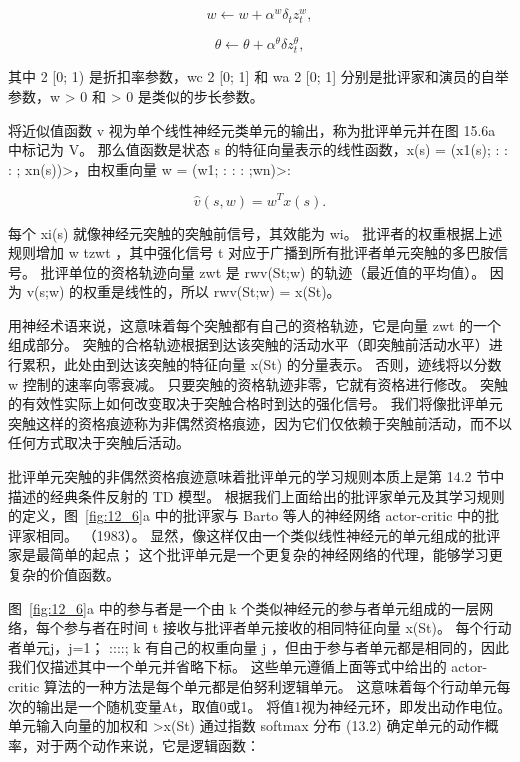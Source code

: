 {\begin{equation}
	w \longleftarrow w + \alpha^w \delta_t z_t^w,
\end{equation}

\begin{equation}
	\theta \longleftarrow \theta + \alpha^{\theta} \delta z_t^{\theta},
\end{equation}

其中 2 [0; 1) 是折扣率参数，wc 2 [0; 1] 和 wa 2 [0; 1] 分别是批评家和演员的自举参数，w > 0 和 > 0 是类似的步长参数。


将近似值函数 v 视为单个线性神经元类单元的输出，称为批评单元并在图 15.6a 中标记为 V。 那么值函数是状态 s 的特征向量表示的线性函数，x(s) = (x1(s); : : : ; xn(s))>，由权重向量 w = (w1; : : : ;wn)>:

\begin{equation}
	\hat{v}(s, w) = w^T x(s).
\end{equation}


每个 xi(s) 就像神经元突触的突触前信号，其效能为 wi。 
批评者的权重根据上述规则增加 w tzwt ，其中强化信号 t 对应于广播到所有批评者单元突触的多巴胺信号。
批评单位的资格轨迹向量 zwt 是 rwv(St;w) 的轨迹（最近值的平均值）。
因为 v(s;w) 的权重是线性的，所以 rwv(St;w) = x(St)。


用神经术语来说，这意味着每个突触都有自己的资格轨迹，它是向量 zwt 的一个组成部分。
突触的合格轨迹根据到达该突触的活动水平（即突触前活动水平）进行累积，此处由到达该突触的特征向量 x(St) 的分量表示。
否则，迹线将以分数 w 控制的速率向零衰减。
只要突触的资格轨迹非零，它就有资格进行修改。
突触的有效性实际上如何改变取决于突触合格时到达的强化信号。
我们将像批评单元突触这样的资格痕迹称为非偶然资格痕迹，因为它们仅依赖于突触前活动，而不以任何方式取决于突触后活动。


批评单元突触的非偶然资格痕迹意味着批评单元的学习规则本质上是第 14.2 节中描述的经典条件反射的 TD 模型。
根据我们上面给出的批评家单元及其学习规则的定义，图~\ref{fig:12_6}a 中的批评家与 Barto 等人的神经网络 actor-critic 中的批评家相同。 （1983）。
显然，像这样仅由一个类似线性神经元的单元组成的批评家是最简单的起点；
这个批评单元是一个更复杂的神经网络的代理，能够学习更复杂的价值函数。


图~\ref{fig:12_6}a 中的参与者是一个由 k 个类似神经元的参与者单元组成的一层网络，每个参与者在时间 t 接收与批评者单元接收的相同特征向量 x(St)。
每个行动者单元j，j=1； ::::; k 有自己的权重向量 j ，但由于参与者单元都是相同的，因此我们仅描述其中一个单元并省略下标。
这些单元遵循上面等式中给出的 actor-critic 算法的一种方法是每个单元都是伯努利逻辑单元。
这意味着每个行动单元每次的输出是一个随机变量At，取值0或1。
将值1视为神经元环，即发出动作电位。
单元输入向量的加权和 >x(St) 通过指数 softmax 分布 (13.2) 确定单元的动作概率，对于两个动作来说，它是逻辑函数：

}
